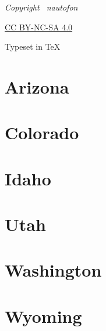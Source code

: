 {
\centering \vspace{30mm} \footnotesize \itshape
Copyright \raisebox{.2ex}{\scriptsize\copyright} \the\year\ nautofon \par
\vspace{.4ex}
\href{https://creativecommons.org/licenses/by-nc-sa/4.0/}{CC BY-NC-SA 4.0} \par
\vspace{.4ex}
Typeset in \TeX \par
}
\thispagestyle{empty}

\tableofcontents
\thispagestyle{empty}

\chapter{Arizona}


\chapter{Colorado}


\chapter{Idaho}


\chapter{Utah}


\chapter{Washington}


\chapter{Wyoming}



